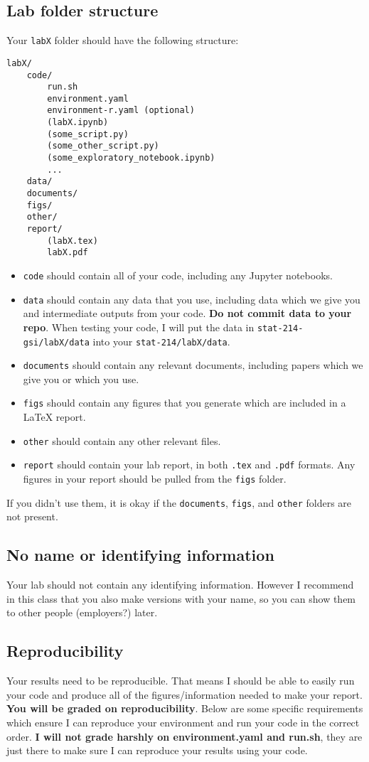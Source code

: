 \documentclass[letterpaper,12pt]{article}
\begin{document}
\subsection{Lab folder structure}

Your \texttt{labX} folder should have the following structure:
\begin{verbatim}
labX/
    code/
        run.sh
        environment.yaml
        environment-r.yaml (optional)
        (labX.ipynb)
        (some_script.py)
        (some_other_script.py)
        (some_exploratory_notebook.ipynb)
        ...
    data/
    documents/
    figs/
    other/
    report/
        (labX.tex)
        labX.pdf
\end{verbatim}
\begin{itemize}
    \item \texttt{code} should contain all of your code, including any Jupyter notebooks.
    \item  \texttt{data} should contain any data that you use, including data which we give you and intermediate outputs from your code. \textbf{Do not commit data to your repo}. When testing your code, I will put the data in \texttt{stat-214-gsi/labX/data} into your \texttt{stat-214/labX/data}.
    \item \texttt{documents} should contain any relevant documents, including papers which we give you or which you use.
    \item \texttt{figs} should contain any figures that you generate which are included in a LaTeX report.
    \item \texttt{other} should contain any other relevant files.
    \item \texttt{report} should contain your lab report, in both \texttt{.tex} and \texttt{.pdf} formats. Any figures in your report should be pulled from the \texttt{figs} folder.
\end{itemize}
If you didn't use them, it is okay if the \texttt{documents}, \texttt{figs}, and \texttt{other} folders are not present.

\subsection{No name or identifying information}
Your lab should not contain any identifying information. However I recommend in this class that you also make versions with your name, so you can show them to other people (employers?) later.

\subsection{Reproducibility}
Your results need to be reproducible. That means I should be able to easily run your code and produce all of the figures/information needed to make your report. \textbf{You will be graded on reproducibility}. Below are some specific requirements which ensure I can reproduce your environment and run your code in the correct order. \textbf{I will not grade harshly on environment.yaml and run.sh}, they are just there to make sure I can reproduce your results using your code.
\end{document}
